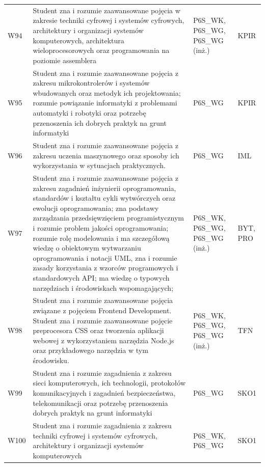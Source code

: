 \documentclass[12pt,a4paper]{article}
\begin{document}
{\begin{longtable}{m{1cm}m{8.8cm}m{2.1cm}m{2.5cm}}
\rowcolor{tableRowAlt} W94 & Student zna i rozumie zaawansowane pojęcia w zakresie techniki cyfrowej i systemów cyfrowych, architektury i organizacji systemów komputerowych, architektura wieloprocesorowych oraz programowania na poziomie assemblera & {\scriptsize P6S\_WK, P6S\_WG, P6S\_WG {\scriptsize (inż.)}} & {\scriptsize KPIR} \\
\rowcolor{tableRowLight} W95 & Student zna i rozumie zaawansowane pojęcia z zakresu mikrokontrolerów i systemów wbudowanych oraz metodyk ich projektowania; rozumie powiązanie informatyki z problemami automatyki i robotyki oraz potrzebę przenoszenia ich dobrych praktyk na grunt informatyki & {\scriptsize P6S\_WG} & {\scriptsize KPIR} \\
\rowcolor{tableRowAlt} W96 & Student zna i rozumie zaawansowane pojęcia z zakresu uczenia maszynowego oraz sposoby ich wykorzystania w sytuacjach praktycznych. & {\scriptsize P6S\_WG} & {\scriptsize IML} \\
\rowcolor{tableRowLight} W97 & Student zna i rozumie zaawansowane pojęcia z zakresu zagadnień inżynierii oprogramowania, standardów i kształtu cykli wytwórczych oraz ewolucji oprogramowania; zna podstawy zarządzania przedsięwzięciem programistycznym i rozumie problem jakości oprogramowania; rozumie rolę modelowania i ma szczegółową wiedzę o obiektowym wytwarzaniu oprogramowania i notacji UML, zna i rozumie zasady korzystania z wzorców programowych i standardowych API; ma wiedzę o typowych narzędziach i środowiskach wspomagających; & {\scriptsize P6S\_WK, P6S\_WG, P6S\_WG {\scriptsize (inż.)}} & {\scriptsize BYT, PRO} \\
\rowcolor{tableRowAlt} W98 & Student zna i rozumie zaawansowane pojęcia związane z pojęciem Frontend Development. Student zna i rozumie zaawansowane pojęcie preprocesora CSS oraz tworzenia aplikacji webowej z wykorzystaniem narzędzia Node.js oraz przykładowego narzędzia w tym środowisku. & {\scriptsize P6S\_WK, P6S\_WG, P6S\_WG {\scriptsize (inż.)}} & {\scriptsize TFN} \\
\rowcolor{tableRowLight} W99 & Student zna i rozumie zagadnienia z zakresu sieci komputerowych, ich technologii, protokołów komunikacyjnych i zagadnień bezpieczeństwa, telekomunikacji oraz potrzebę przenoszenia dobrych praktyk na grunt informatyki & {\scriptsize P6S\_WG} & {\scriptsize SKO1} \\
\rowcolor{tableRowAlt} W100 & Student zna i rozumie zagadnienia z zakresu techniki cyfrowej i systemów cyfrowych, architektury i organizacji systemów komputerowych & {\scriptsize P6S\_WK, P6S\_WG} & {\scriptsize SKO1} \\

\end{longtable}}
\end{document}
